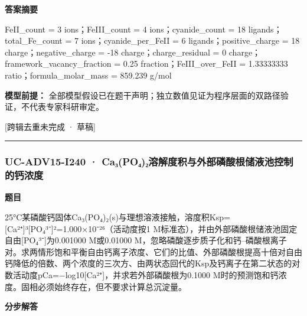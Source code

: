 \documentclass[UTF8,11pt,a4paper]{ctexart}
\begin{document}
\noindent\textbf{答案摘要}\par
FeII\_count = 3 ions；FeIII\_count = 4 ions；cyanide\_count = 18 ligands；total\_Fe\_count = 7 ions；cyanide\_per\_FeII = 6 ligands；positive\_charge = 18 charge；negative\_charge = -18 charge；charge\_residual = 0 charge；framework\_vacancy\_fraction = 0.25 fraction；FeIII\_over\_FeII = 1.33333333 ratio；formula\_molar\_mass = 859.239 g/mol\par
\noindent\textbf{模型前提：}
全部模型假设已在题干声明；独立数值见证为程序层面的双路径验证，不代表专家科研审定。\par
\noindent\textcolor{red!65!black}{[跨辑去重未完成 · 草稿]} \par
\medskip\hrule\medskip
{}
\subsubsection*{UC-ADV15-I240 · Ca₃(PO₄)₂溶解度积与外部磷酸根储液池控制的钙浓度}
\noindent\textbf{题目}\par
25°C某磷酸钙固体Ca₃(PO₄)₂(s)与理想溶液接触，溶度积Ksp=[Ca²⁺]³[PO₄³⁻]²=1.000×10⁻²⁶（活动度按1 M标准态），并由外部磷酸根储液池固定自由[PO₄³⁻]为0.001000 M或0.01000 M，忽略磷酸逐步质子化和钙–磷酸根离子对。求两情形饱和平衡自由钙离子浓度、它们的比值、外部磷酸根提高十倍对自由钙降低的倍数、两个浓度的三次方、由两状态回代的Ksp及钙离子在第二状态的对数活动度pCa=−log10[Ca²⁺]，并求若外部磷酸根为0.1000 M时的预测饱和钙浓度。固相必须始终存在，但不要求计算总沉淀量。\par
\medskip\noindent\textbf{分步解答}
\end{document}
